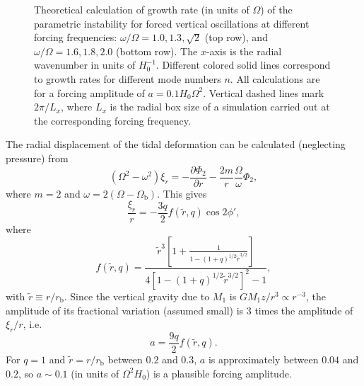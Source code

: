 \documentclass[fleqn,usenatbib]{mnras}
\begin{document}
\begin{figure}
\caption{Theoretical calculation of growth rate (in units of $\Omega$) of the parametric instability for forced vertical oscillations at different forcing frequencies: $\omega / \Omega = 1.0, 1.3, \sqrt{2}$ (top row), and $\omega / \Omega = 1.6, 1.8, 2.0$ (bottom row). The $x$-axis is the radial wavenumber in units of $H_0^{-1}$. Different colored solid lines correspond to growth rates for different mode numbers $n$. All calculations are for a forcing amplitude of $a = 0.1 H_0 \Omega^2$. Vertical dashed lines mark $2\pi/L_x$, where $L_x$ is the radial box size of a simulation carried out at the corresponding forcing frequency.}
\label{FIGURE_ForcedBounceLinearTheoryGrowthRates}
\end{figure}

The radial displacement of the tidal deformation can be calculated (neglecting pressure) from
\begin{equation}
  (\Omega^2-\omega^2)\xi_r=-\frac{\partial\Phi_2}{\partial r}-\frac{2m}{r}\frac{\Omega}{\omega}\Phi_2,
\end{equation}
where $m=2$ and $\omega=2(\Omega-\Omega_\text{b})$. This gives
\begin{equation}
  \frac{\xi_r}{r}=-\frac{3q}{2} f(\tilde r,q)\cos{2\phi'},
\end{equation}
where
\begin{equation}
  f(\tilde{r},q)=\frac{\tilde{r}^3\left[1+\frac{1}{1-(1+q)^{1/2}\tilde{r}^{3/2}}\right]}{4[1-(1+q)^{1/2}\tilde{r}^{3/2}]^2-1},
\end{equation}
with $\tilde{r}\equiv r/r_\text{b}$.
Since the vertical gravity due to $M_1$ is $GM_1z/r^3\propto r^{-3}$, the amplitude of its fractional variation (assumed small) is $3$ times the amplitude of $\xi_r/r$, i.e.
\begin{equation}
  a=\frac{9q}{2}f(\tilde r,q).
\end{equation}
For $q=1$ and $\tilde{r}=r/r_\text{b}$ between $0.2$ and $0.3$, $a$ is approximately between $0.04$ and $0.2$, so $a \sim 0.1$ (in units of $\Omega^2 H_0$) is a plausible forcing amplitude.
\end{document}
